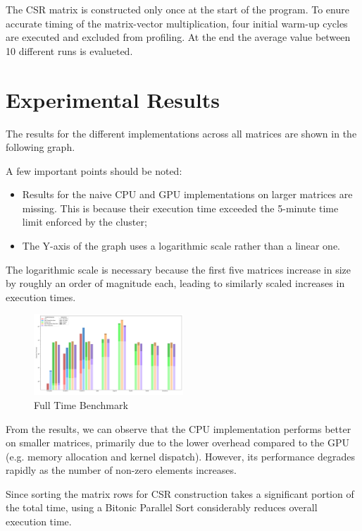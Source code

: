 \documentclass[conference]{IEEEtran}
\begin{document}
        The CSR matrix is constructed only once at the start of the program.
        To enure accurate timing of the matrix-vector multiplication, four
        initial warm-up cycles are executed and excluded from profiling.
        At the end the average value between 10 different runs is evalueted.

    \section{Experimental Results}

    The results for the different implementations across all matrices are shown
    in the following graph.

    A few important points should be noted:
    \begin{itemize}
        \item Results for the naive CPU and GPU implementations on larger
            matrices are missing.
            This is because their execution time exceeded the 5-minute time
            limit enforced by the cluster;
        \item The Y-axis of the graph uses a logarithmic scale rather than a
            linear one.
    \end{itemize}

    The logarithmic scale is necessary because the first five matrices increase
    in size by roughly an order of magnitude each, leading to similarly scaled
    increases in execution times.

    \begin{figure}[ht]
        \caption{Full Time Benchmark}
        \centering
        \includegraphics[width=0.5\textwidth]{full-benchmark.png}
    \end{figure}

    From the results, we can observe that the CPU implementation performs
    better on smaller matrices, primarily due to the lower overhead compared to
    the GPU (e.g. memory allocation and kernel dispatch).
    However, its performance degrades rapidly as the number of non-zero
    elements increases.

    Since sorting the matrix rows for CSR construction takes a significant
    portion of the total time, using a Bitonic Parallel Sort considerably
    reduces overall execution time.
\end{document}
